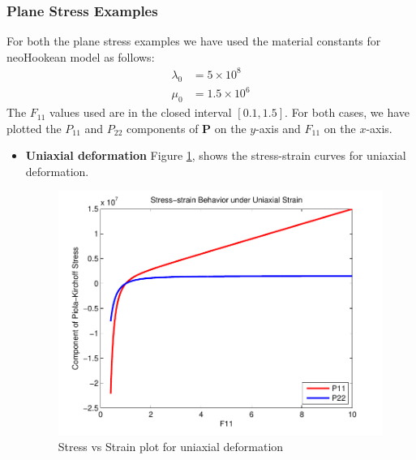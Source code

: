 \documentclass[../main.tex]{subfiles}
\begin{document}
\subsubsection{Plane Stress Examples}

For both the plane stress examples we have used the material constants
for neoHookean model as follows:
\begin{align*}
  \lambda_0 &= 5\times10^8\\
  \mu_0 & = 1.5\times10^6
\end{align*}
The $F_{11}$ values used are in the closed interval $[0.1,1.5]$. For
both cases, we have plotted the $P_{11}$ and $P_{22}$ components of
$\mathbf{P}$ on the $y$-axis and $F_{11}$ on the $x$-axis.
\begin{itemize}
\item \textbf{Uniaxial deformation}
Figure \ref{fig:uniaxial}, shows the stress-strain curves for uniaxial
deformation.
\begin{figure}[h]
  \centering
  \includegraphics{./img/Uniaxial_1.pdf}
  \caption{Stress vs Strain plot for uniaxial deformation}
  \label{fig:uniaxial}
\end{figure}


\end{itemize}
\end{document}
